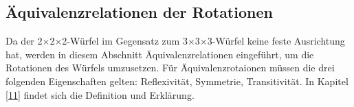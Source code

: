 \documentclass[12pt,a4paper, usenames, dvipsnames]{article}
\theoremstyle{mystyle}
\theoremstyle{definition}
\newcommand{\Ttwo}{2$\times$2$\times$2-}
\newcommand{\Tthree}{3$\times$3$\times$3-}
\begin{document}







%
%
%
%
%
%
%
%
%
%
%
%
%
%
%
%
%
%
%
%
\color{black}

\subsection*{Äquivalenzrelationen der Rotationen}

Da der \Ttwo Würfel im Gegensatz zum \Tthree Würfel keine feste Ausrichtung hat, werden in diesem Abschnitt Äquivalenzrelationen eingeführt, um die Rotationen des Würfels umzusetzen.
Für Äquivalenzrotaionen müssen die drei folgenden Eigenschaften gelten: Reflexivität, Symmetrie, Transitivität. In Kapitel \ref{11} findet sich die Definition und Erklärung.
\end{document}
